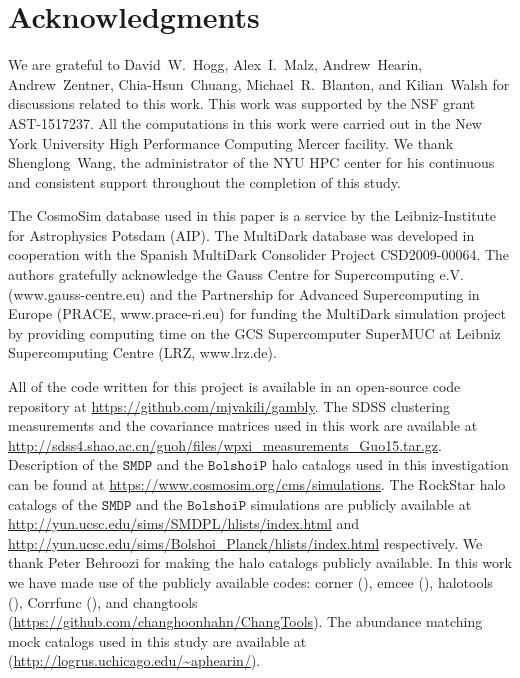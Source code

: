 \documentclass[12pt, preprint]{aastex}
\begin{document}
\section*{Acknowledgments}

We are grateful to David~W.~Hogg, Alex~I.~Malz, Andrew~Hearin, Andrew~Zentner, Chia-Hsun~Chuang, Michael~R.~Blanton, and Kilian~Walsh for discussions related to this work. This work was supported by the NSF grant AST-1517237. All the computations in this work were carried out in the New York University High Performance Computing Mercer facility. We thank Shenglong~Wang, the administrator of the NYU HPC center for his continuous and consistent support throughout the completion of this study. 

The CosmoSim database used in this paper is a service by the Leibniz-Institute for Astrophysics Potsdam (AIP). The MultiDark database was developed in cooperation with the Spanish MultiDark Consolider Project CSD2009-00064. The authors gratefully acknowledge the Gauss Centre for Supercomputing e.V. (www.gauss-centre.eu) and the Partnership for Advanced Supercomputing in Europe (PRACE, www.prace-ri.eu) for funding the MultiDark simulation project by providing computing time on the GCS Supercomputer SuperMUC at Leibniz Supercomputing Centre (LRZ, www.lrz.de).

All of the code written for this project is available in an open-source
code repository at \url{https://github.com/mjvakili/gambly}. The SDSS clustering measurements and the covariance matrices used in this work are available at \url{http://sdss4.shao.ac.cn/guoh/files/wpxi_measurements_Guo15.tar.gz}. Description of the $\mathtt{SMDP}$ and the $\mathtt{BolshoiP}$ halo catalogs used in this investigation can be found at \url{https://www.cosmosim.org/cms/simulations}. The RockStar halo catalogs of the $\mathtt{SMDP}$ and the $\mathtt{BolshoiP}$ simulations are publicly available at \url{http://yun.ucsc.edu/sims/SMDPL/hlists/index.html} and \url{http://yun.ucsc.edu/sims/Bolshoi_Planck/hlists/index.html} respectively. We thank Peter Behroozi for making the halo catalogs publicly available. In this work we have made use of the publicly available codes: corner (\citealt{corner}), emcee (\citealt{emcee}), halotools (\citealt{halotools}), Corrfunc (\citealt{corrfunc}), and changtools (\url{https://github.com/changhoonhahn/ChangTools}). The abundance matching mock catalogs used in this study are available at (\url{http://logrus.uchicago.edu/~aphearin/}).  
\end{document}
